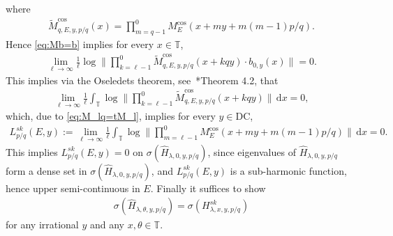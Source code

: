 \documentclass[11pt]{amsart}
\newcommand{\T}{\mathbb T}
\begin{document}
where 
\begin{align}
\widetilde{M}^{\cos}_{q,E,y,p/q}(x)=\prod_{m=q-1}^0 M_E^{\cos}(x+my+m(m-1)p/q).
\end{align}
Hence \eqref{eq:Mb=b} implies for every $x\in \T$,
\begin{align}
    \lim_{\ell\to\infty}\frac{1}{\ell}\log \|\prod_{k=\ell-1}^{0} \widetilde{M}^{\cos}_{q,E,y,p/q}(x+kqy)\cdot b_{0, y}(x)\|=0.
\end{align}
This implies via the Oseledets theorem, see~\cite{V}*{Theorem 4.2}, that
\begin{align}
    \lim_{\ell\to\infty}\frac{1}{\ell}\int_{\T} \log \|\prod_{k=\ell-1}^{0} \widetilde{M}^{\cos}_{q,E,y,p/q}(x+kqy)\|\, \mathrm{d}x=0,
\end{align}
which, due to \eqref{eq:M_lq=tM_l}, implies for every $y\in \mathrm{DC}$,
\begin{align}\label{def:LE_sk_y}
    L^{sk}_{p/q}(E,y):=\lim_{\ell\to\infty} \frac{1}{\ell}\int_{\T} \log \|\prod_{m=\ell-1}^0 M_E^{\cos}(x+my+m(m-1)p/q)\|\, \mathrm{d}x=0.
\end{align}
This implies $L^{sk}_{p/q}(E,y)=0$ on $\sigma(\widehat{H}_{\lambda,0,y,p/q})$, since eigenvalues of $\widehat{H}_{\lambda,0,y,p/q}$ form a dense set in $\sigma(\widehat{H}_{\lambda,0,y,p/q})$, and $L^{sk}_{p/q}(E,y)$ is a sub-harmonic function, hence upper semi-continuous in $E$.
Finally it suffices to show
\begin{align}\label{eq:claimed_dual}
\sigma(\widehat{H}_{\lambda,\theta,y,p/q})=\sigma(H^{sk}_{\lambda,x,y,p/q})
\end{align}
for any irrational $y$ and any $x,\theta\in \T$. 
\end{document}

